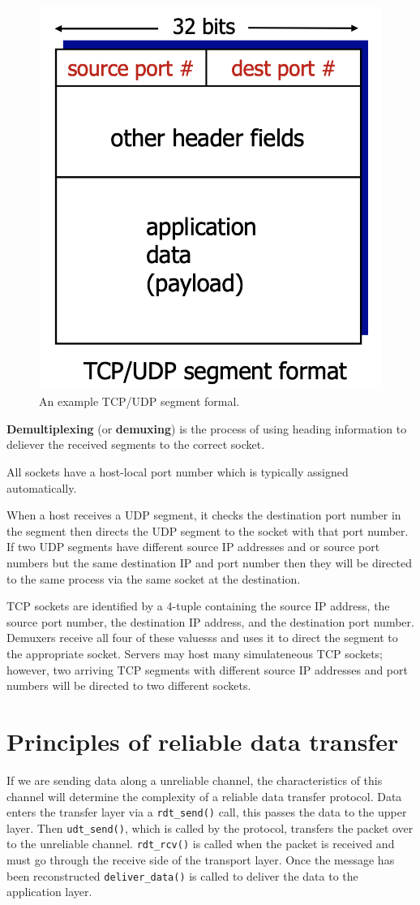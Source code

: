 \begin{figure}
    \centering
    \includegraphics[width=0.6\linewidth]{images/segment-example.png}
    \caption{An example TCP/UDP segment formal.}
    \label{fig:segment-example}
\end{figure}

\begin{definition}[Demultiplexing]
    \textbf{Demultiplexing} (or \textbf{demuxing}) is the process of using heading information to deliever the received segments to the correct socket.
\end{definition}

All sockets have a host-local port number which is typically assigned automatically. 

When a host receives a UDP segment, it checks the destination port number in the segment then directs the UDP segment to the socket with that port number. 
If two UDP segments have different source IP addresses and or source port numbers but the same destination IP and port number then they will be directed to the same process via the same socket at the destination.

TCP sockets are identified by a $4$-tuple containing the source IP address, the source port number, the destination IP address, and the destination port number. Demuxers receive all four of these valuesss and uses it to direct the segment to the appropriate socket. Servers may host many simulateneous TCP sockets; however, two arriving TCP segments with different source IP addresses and port numbers will be directed to two different sockets.

\section{Principles of reliable data transfer}

If we are sending data along a unreliable channel, the characteristics of this channel will determine the complexity of a reliable data transfer protocol. 
Data enters the transfer layer via a \texttt{rdt\_send()} call, this passes the data to the upper layer. 
Then \texttt{udt\_send()}, which is called by the protocol, transfers the packet over to the unreliable channel. 
\texttt{rdt\_rcv()} is called when the packet is received and must go through the receive side of the transport layer. 
Once the message has been reconstructed \texttt{deliver\_data()} is called to deliver the data to the application layer.
